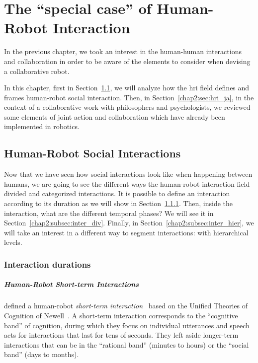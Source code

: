 \documentclass[a4paper,11pt,twoside]{StyleThese}
\begin{document}
	\setcounter{chapter}{1} %
	\dominitoc
	\faketableofcontents
	\fi


\chapter{The ``special case'' of Human-Robot Interaction}\label{chapter:chap2}
\minitoc

In the previous chapter, we took an interest in the human-human interactions and collaboration in order to be aware of the elements to consider when devising a collaborative robot. 

In this chapter, first in Section~\ref{chap2:sec:soc_inter}, we will analyze how the \acrshort{hri} field defines and frames human-robot social interaction. Then, in Section~\ref{chap2:sec:hri_ja}, in the context of a collaborative work with philosophers and psychologists, we reviewed some elements of joint action and collaboration which have already been implemented in robotics.

\section{Human-Robot Social Interactions}\label{chap2:sec:soc_inter}

Now that we have seen how social interactions look like when happening between humans, we are going to see the different ways the human-robot interaction field divided and categorized interactions. It is possible to define an interaction according to its duration as we will show in Section~\ref{chap2:subsec:inter_lengths}. Then, inside the interaction, what are the different temporal phases? We will see it in Section~\ref{chap2:subsec:inter_div}. Finally, in Section~\ref{chap2:subsec:inter_hier}, we will take an interest in a different way to segment interactions: with hierarchical levels.

\subsection{Interaction durations}\label{chap2:subsec:inter_lengths}
\paragraph{Human-Robot Short-term Interactions}
\cite{zheng_2013_designing} defined a human-robot \emph{short-term interaction}~ based on the Unified Theories of Cognition of Newell~\citep{newell_1994_unified}. A short-term interaction corresponds to the ``cognitive band'' of cognition, during which they focus on individual utterances and speech acts for interactions that last for tens of seconds. They left aside longer-term interactions that can be in the ``rational band'' (minutes to hours) or the ``social band'' (days to months).
\end{document}
